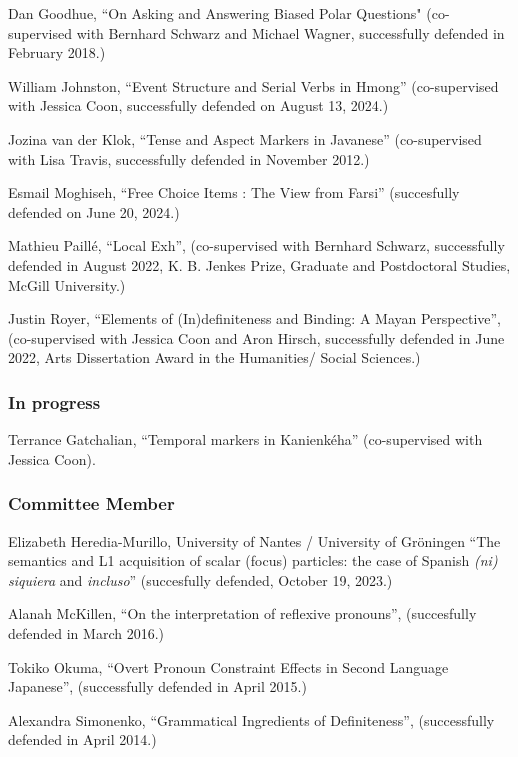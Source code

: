 \documentclass[11pt]{article}
\begin{document}
Dan Goodhue, ``On Asking and Answering Biased Polar Questions" (co-supervised with Bernhard Schwarz and Michael Wagner, successfully defended in February 2018.)

William Johnston, ``Event Structure and Serial Verbs in Hmong'' (co-supervised with Jessica Coon, successfully defended on August 13, 2024.)

Jozina van der Klok, ``Tense and Aspect Markers in Javanese'' (co-supervised with Lisa Travis, successfully defended in November
2012.)
 
Esmail Moghiseh, ``Free Choice Items : The View from Farsi'' (succesfully defended on June 20, 2024.)

Mathieu Paill\'e, ``Local Exh'', (co-supervised with Bernhard Schwarz, successfully defended in August 2022, K. B. Jenkes Prize, Graduate and Postdoctoral Studies, McGill University.)

Justin Royer, ``Elements of (In)definiteness and Binding: A Mayan Perspective'', (co-supervised with Jessica Coon and Aron Hirsch, successfully defended in June
2022, Arts Dissertation Award in the Humanities/ Social Sciences.)

\vspace{-10pt}

\subsubsection*{In progress}

Terrance Gatchalian, ``Temporal markers in Kanienk\'eha'' (co-supervised with Jessica Coon).

\vspace{-10pt}

\subsubsection*{Committee Member}

Elizabeth Heredia-Murillo, University of Nantes / University of Gr\"{o}ningen ``The semantics and L1 acquisition of scalar (focus) particles: the case of Spanish \textit{(ni) siquiera} and \textit{incluso}'' (succesfully defended, October 19, 2023.)

Alanah McKillen, ``On the interpretation of reflexive pronouns'', (succesfully defended in March 2016.)

Tokiko Okuma, ``Overt Pronoun Constraint Effects in Second Language Japanese'', (successfully defended in April 2015.)

Alexandra Simonenko, ``Grammatical Ingredients of Definiteness'',
(successfully defended in April 2014.)
\vspace{-10pt}
\end{document}
